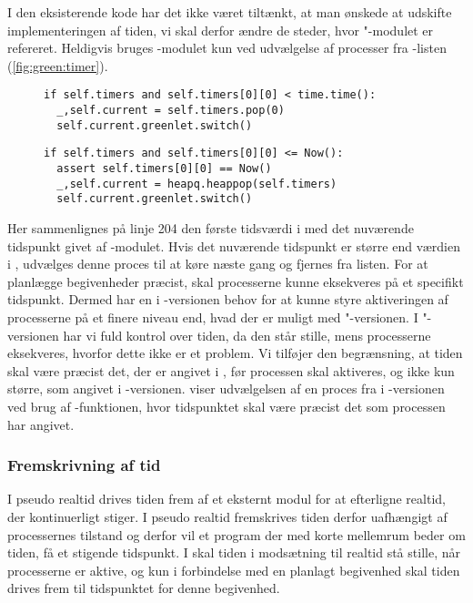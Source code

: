 I den eksisterende kode har det ikke været tiltænkt, at man ønskede at udskifte implementeringen af tiden, vi skal derfor ændre de steder, hvor "-modulet er refereret. Heldigvis bruges -modulet kun ved udvælgelse af processer fra -listen (\cref{fig:green:timer}). 
\begin{figure}[hbtp]
\begin{minipage}[c]{\linewidth}
\begin{lstlisting}[firstnumber=204, label=fig:green:timer, caption=Udvælgelse af proces fra listen timers (fra scheduling.py)]
if self.timers and self.timers[0][0] < time.time():
  _,self.current = self.timers.pop(0)
  self.current.greenlet.switch()
\end{lstlisting}
\end{minipage}
\begin{minipage}[c]{\linewidth}
\begin{lstlisting}[firstnumber=124, label=fig:sim:timer, caption=Udvælgelse af proces fra listen timers (fra simulation.py)]
if self.timers and self.timers[0][0] <= Now():
  assert self.timers[0][0] == Now()
  _,self.current = heapq.heappop(self.timers)
  self.current.greenlet.switch()
\end{lstlisting}
\end{minipage}
\end{figure}
Her sammenlignes på linje 204 den første tidsværdi i  med det nuværende tidspunkt givet af -modulet.
Hvis det nuværende tidspunkt er større end værdien i , udvælges denne proces til at køre næste gang og fjernes fra listen.
For at planlægge begivenheder præcist, skal processerne kunne eksekveres på et specifikt tidspunkt. Dermed har  \sched en i -versionen behov for at kunne  styre aktiveringen af processerne på et finere niveau end, hvad der er muligt med "-versionen.  
I "-versionen har vi fuld kontrol over tiden, da  den står stille, mens processerne eksekveres, hvorfor dette ikke er et problem.
Vi  tilføjer den begrænsning, at tiden skal være præcist det, der er angivet i , før processen skal aktiveres, og ikke kun større, som angivet i -versionen.  viser udvælgelsen af en proces fra  i -versionen ved brug af -funktionen, hvor tidspunktet skal være præcist det som processen har angivet.

\subsubsection{Fremskrivning af tid}
I pseudo realtid drives tiden frem af et eksternt modul for at efterligne realtid, der kontinuerligt stiger. I pseudo realtid fremskrives tiden derfor uafhængigt af processernes tilstand og derfor vil et program der med korte mellemrum beder om tiden, få et stigende tidspunkt. I \des  skal tiden i modsætning til realtid stå stille, når processerne er aktive, og kun i forbindelse med en planlagt begivenhed skal tiden drives frem til tidspunktet for denne begivenhed.

